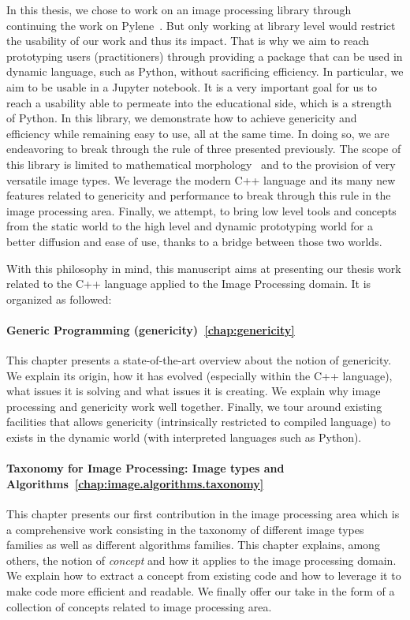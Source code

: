 In this thesis, we chose to work on an image processing library through continuing the work on
Pylene~\parencite{carlinet.2018.pylena}. But only working at library level would restrict the usability of our work and
thus its impact. That is why we aim to reach prototyping users (practitioners) through providing a package that can be
used in dynamic language, such as Python, without sacrificing efficiency. In particular, we aim to be usable in a
Jupyter notebook. It is a very important goal for us to reach a usability able to permeate into the educational side,
which is a strength of Python. In this library, we demonstrate how to achieve genericity and efficiency while remaining
easy to use, all at the same time. In doing so, we are endeavoring to break through the rule of three presented
previously. The scope of this library is limited to mathematical
morphology~\parencite{najman.2013.mathematical,geraud.2010.book} and to the provision of very versatile image types. We
leverage the modern C++ language and its many new features related to genericity and performance to break through this
rule in the image processing area. Finally, we attempt, to bring low level tools and concepts from the static world to
the high level and dynamic prototyping world for a better diffusion and ease of use, thanks to a bridge between those
two worlds.

With this philosophy in mind, this manuscript aims at presenting our thesis work related to the C++ language applied to
the Image Processing domain. It is organized as followed:

\paragraph{Generic Programming (genericity)~\ref{chap:genericity}} This chapter presents a state-of-the-art overview
about the notion of genericity. We explain its origin, how it has evolved (especially within the C++ language), what
issues it is solving and what issues it is creating. We explain why image processing and genericity work well together.
Finally, we tour around existing facilities that allows genericity (intrinsically restricted to compiled language) to
exists in the dynamic world (with interpreted languages such as Python).

\paragraph{Taxonomy for Image Processing: Image types and Algorithms~\ref{chap:image.algorithms.taxonomy}} This chapter
presents our first contribution in the image processing area which is a comprehensive work consisting in the taxonomy of
different image types families as well as different algorithms families. This chapter explains, among others, the notion
of \emph{concept} and how it applies to the image processing domain. We explain how to extract a concept from existing
code and how to leverage it to make code more efficient and readable. We finally offer our take in the form of a
collection of concepts related to image processing area.

